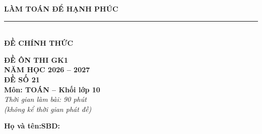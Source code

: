 \documentclass[12pt,a4paper]{article}
\begin{document}
\noindent
\begin{minipage}[c]{0.38\textwidth}
    \centering
    \textbf{LÀM TOÁN ĐỂ HẠNH PHÚC}\\[-2pt]
    \rule{3.2cm}{0.6pt}\\[4pt]
    \textbf{ĐỀ CHÍNH THỨC}
\end{minipage}\hfill
\begin{minipage}[c]{0.35\textwidth}
    \centering
    \textbf{ĐỀ ÔN THI GK1}\\
    \textbf{NĂM HỌC 2026 -- 2027}\\[2pt]
    \textbf{ĐỀ SỐ 21}\\
    \textbf{Môn: TOÁN -- Khối lớp 10}\\
    \textit{\small Thời gian làm bài: 90 phút\\(không kể thời gian phát đề)}
\end{minipage}

\vspace{0.15cm}
\noindent
\begin{minipage}[b]{0.78\textwidth}
    \textbf{Họ và tên:}\dotfill\textbf{SBD:}\makebox[3.5cm]{\dotfill}
\end{minipage}\hfill
\begin{minipage}[b]{0.20\textwidth}
    \hfill
    \setlength{\fboxrule}{0.8pt}%
\end{minipage}
\vspace{0.15cm}
\end{document}
